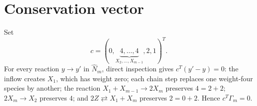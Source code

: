 \section*{Conservation vector}
Set
\[
c=(0,\underbrace{4,\ldots,4}_{X_2,\ldots,X_{m-1}},2,1)^T.
\]
For every reaction $y\to y'$ in $\widehat N_m$, direct inspection gives
$c^T(y'-y)=0$: the inflow creates $X_1$, which has weight zero; each chain
step replaces one weight-four species by another; the reaction
$X_1+X_{m-1}\to2X_m$ preserves $4=2+2$; $2X_m\to X_2$ preserves $4$; and
$2Z\rightleftarrows X_1+X_m$ preserves $2=0+2$.  Hence $c^T\Gamma_m=0$.
